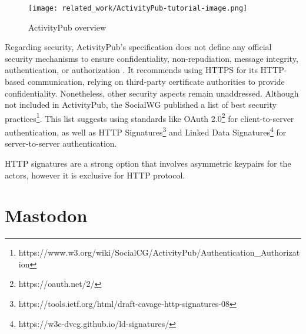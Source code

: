 \begin{figure}[H]
  \centering
  \texttt{[image: related\_work/ActivityPub-tutorial-image.png]}
  \caption{ActivityPub overview \cite{lemmer-webber_tallon_guy_prodromou_2018}}
  \label{fig:ap_flow}
\end{figure}

Regarding security, ActivityPub's specification does not define any official security mechanisms to ensure confidentiality, non-repudiation, message integrity, authentication, or authorization \cite{lemmer-webber_tallon_guy_prodromou_2018}. It recommends using HTTPS for its HTTP-based communication, relying on third-party certificate authorities to provide confidentiality. Nonetheless, other security aspects remain unaddressed. Although not included in ActivityPub, the SocialWG published a list of best security practices\footnote{https://www.w3.org/wiki/SocialCG/ActivityPub/Authentication\_Authorization}. This list suggests using standards like OAuth 2.0\footnote{https://oauth.net/2/} for client-to-server authentication, as well as HTTP Signatures\footnote{https://tools.ietf.org/html/draft-cavage-http-signatures-08} and Linked Data Signatures\footnote{https://w3c-dvcg.github.io/ld-signatures/} for server-to-server authentication.

HTTP signatures are a strong option that involves asymmetric keypairs for the actors, however it is exclusive for HTTP protocol.


\section{Mastodon}
